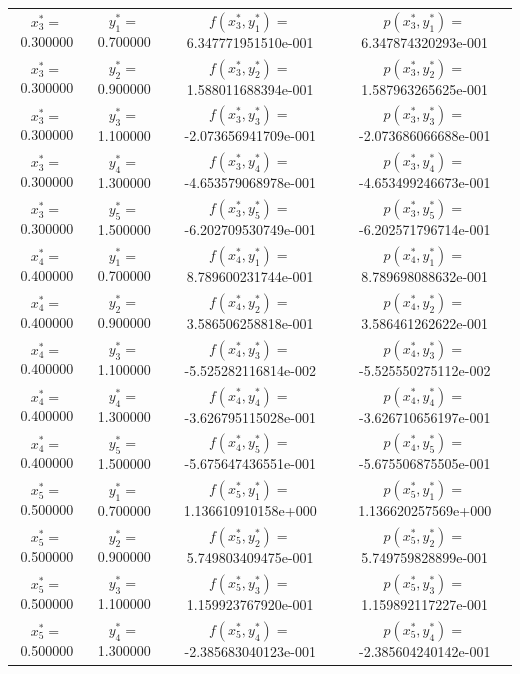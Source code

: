 \begin{longtable}{cccc}
$x_{3}^{\ast}=$0.300000 & $y_{1}^{\ast}=$0.700000 & $f(x_{3}^{\ast},y_{1}^{\ast})=$6.347771951510e-001 &$p(x_{3}^{\ast},y_{1}^{\ast})=$6.347874320293e-001 \\
$x_{3}^{\ast}=$0.300000 & $y_{2}^{\ast}=$0.900000 & $f(x_{3}^{\ast},y_{2}^{\ast})=$1.588011688394e-001 &$p(x_{3}^{\ast},y_{2}^{\ast})=$1.587963265625e-001 \\
$x_{3}^{\ast}=$0.300000 & $y_{3}^{\ast}=$1.100000 & $f(x_{3}^{\ast},y_{3}^{\ast})=$-2.073656941709e-001 &$p(x_{3}^{\ast},y_{3}^{\ast})=$-2.073686066688e-001 \\
$x_{3}^{\ast}=$0.300000 & $y_{4}^{\ast}=$1.300000 & $f(x_{3}^{\ast},y_{4}^{\ast})=$-4.653579068978e-001 &$p(x_{3}^{\ast},y_{4}^{\ast})=$-4.653499246673e-001 \\
$x_{3}^{\ast}=$0.300000 & $y_{5}^{\ast}=$1.500000 & $f(x_{3}^{\ast},y_{5}^{\ast})=$-6.202709530749e-001 &$p(x_{3}^{\ast},y_{5}^{\ast})=$-6.202571796714e-001 \\
$x_{4}^{\ast}=$0.400000 & $y_{1}^{\ast}=$0.700000 & $f(x_{4}^{\ast},y_{1}^{\ast})=$8.789600231744e-001 &$p(x_{4}^{\ast},y_{1}^{\ast})=$8.789698088632e-001 \\
$x_{4}^{\ast}=$0.400000 & $y_{2}^{\ast}=$0.900000 & $f(x_{4}^{\ast},y_{2}^{\ast})=$3.586506258818e-001 &$p(x_{4}^{\ast},y_{2}^{\ast})=$3.586461262622e-001 \\
$x_{4}^{\ast}=$0.400000 & $y_{3}^{\ast}=$1.100000 & $f(x_{4}^{\ast},y_{3}^{\ast})=$-5.525282116814e-002 &$p(x_{4}^{\ast},y_{3}^{\ast})=$-5.525550275112e-002 \\
$x_{4}^{\ast}=$0.400000 & $y_{4}^{\ast}=$1.300000 & $f(x_{4}^{\ast},y_{4}^{\ast})=$-3.626795115028e-001 &$p(x_{4}^{\ast},y_{4}^{\ast})=$-3.626710656197e-001 \\
$x_{4}^{\ast}=$0.400000 & $y_{5}^{\ast}=$1.500000 & $f(x_{4}^{\ast},y_{5}^{\ast})=$-5.675647436551e-001 &$p(x_{4}^{\ast},y_{5}^{\ast})=$-5.675506875505e-001 \\
$x_{5}^{\ast}=$0.500000 & $y_{1}^{\ast}=$0.700000 & $f(x_{5}^{\ast},y_{1}^{\ast})=$1.136610910158e+000 &$p(x_{5}^{\ast},y_{1}^{\ast})=$1.136620257569e+000 \\
$x_{5}^{\ast}=$0.500000 & $y_{2}^{\ast}=$0.900000 & $f(x_{5}^{\ast},y_{2}^{\ast})=$5.749803409475e-001 &$p(x_{5}^{\ast},y_{2}^{\ast})=$5.749759828899e-001 \\
$x_{5}^{\ast}=$0.500000 & $y_{3}^{\ast}=$1.100000 & $f(x_{5}^{\ast},y_{3}^{\ast})=$1.159923767920e-001 &$p(x_{5}^{\ast},y_{3}^{\ast})=$1.159892117227e-001 \\
$x_{5}^{\ast}=$0.500000 & $y_{4}^{\ast}=$1.300000 & $f(x_{5}^{\ast},y_{4}^{\ast})=$-2.385683040123e-001 &$p(x_{5}^{\ast},y_{4}^{\ast})=$-2.385604240142e-001 \\

\end{longtable}
